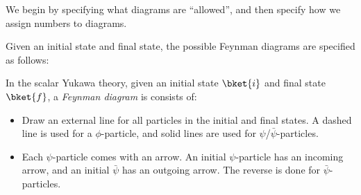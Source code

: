 \documentclass[a4paper]{article}
\begin{document}
We begin by specifying what diagrams are ``allowed'', and then specify how we assign numbers to diagrams.

Given an initial state and final state, the possible Feynman diagrams are specified as follows:
\begin{defi}
  In the scalar Yukawa theory, given an initial state $\bket{i}$ and final state $\bket{f}$, a \emph{Feynman diagram} is consists of:
  \begin{itemize}
    \item Draw an external line for all particles in the initial and final states. A dashed line is used for a $\phi$-particle, and solid lines are used for $\psi$/$\bar\psi$-particles.
    \begin{center}
    \end{center}
  \item Each $\psi$-particle comes with an arrow. An initial $\psi$-particle has an incoming arrow, and an initial $\bar\psi$ has an outgoing arrow. The reverse is done for $\bar\psi$-particles.
    \begin{center}
\end{center}
\end{itemize}
\end{defi}
\end{document}
